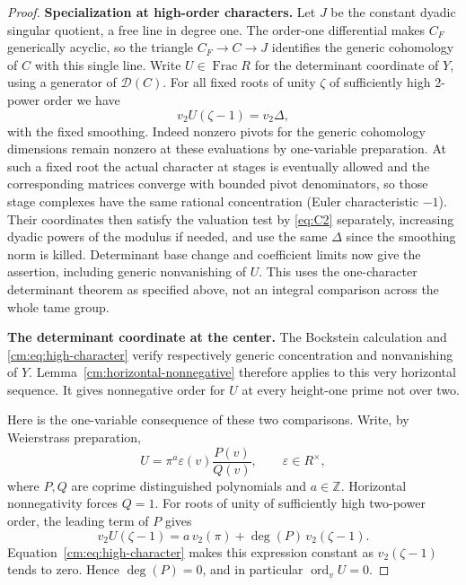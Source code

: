 \begin{proof}
\par\smallskip\noindent\textbf{Specialization at high-order characters.}\enspace
Let \(J\) be the constant dyadic singular quotient, a free line in
degree one. The order-one differential makes \(C_F\) generically
acyclic, so the triangle \(C_F\to C\to J\) identifies the generic
cohomology of \(C\) with this single line. Write
\(U\in\operatorname{Frac}R\) for the determinant coordinate of \(Y\),
using a generator of \(\mathcal D(C)\). For all fixed
roots of unity \(\zeta\) of sufficiently high 2-power order we have
\begin{equation}\label{cm:eq:high-character}
v_2 U(\zeta-1)=v_2\Delta ,
\end{equation}
with the fixed smoothing. Indeed nonzero pivots for the generic cohomology dimensions remain
nonzero at these evaluations by one-variable preparation. At such a fixed root the actual
character at stages is eventually allowed and the corresponding matrices converge with bounded
pivot denominators, so those stage complexes have the same rational concentration (Euler
characteristic \(-1\)). Their coordinates then satisfy the valuation test by \eqref{eq:C2}
separately, increasing dyadic powers of the modulus if needed, and use the same \(\Delta\)
since the smoothing norm is killed. Determinant base change and coefficient limits now give
the assertion, including generic nonvanishing of \(U\). This uses the one-character
determinant theorem as specified above, not an integral comparison across the whole tame
group.

\par\smallskip\noindent\textbf{The determinant coordinate at the center.}\enspace
The Bockstein calculation and \eqref{cm:eq:high-character} verify
respectively generic concentration and nonvanishing of \(Y\).
Lemma~\ref{cm:horizontal-nonnegative} therefore applies to this very
horizontal sequence. It gives nonnegative order for \(U\) at every
height-one prime not over two.

Here is the one-variable consequence of these two comparisons. Write,
by Weierstrass preparation,
\[
 U=\pi^a\varepsilon(v)\frac{P(v)}{Q(v)},
 \qquad \varepsilon\in R^\times,
\]
where \(P,Q\) are coprime distinguished polynomials and \(a\in\mathbb Z\).
Horizontal nonnegativity forces \(Q=1\). For roots of unity of
sufficiently high two-power order, the leading term of \(P\) gives
\[
 v_2 U(\zeta-1)
   =a\,v_2(\pi)+\deg(P)\,v_2(\zeta-1).
\]
Equation~\eqref{cm:eq:high-character} makes this expression constant
as \(v_2(\zeta-1)\) tends to zero. Hence \(\deg(P)=0\), and in
particular \(\operatorname{ord}_v U=0\).


\end{proof}
